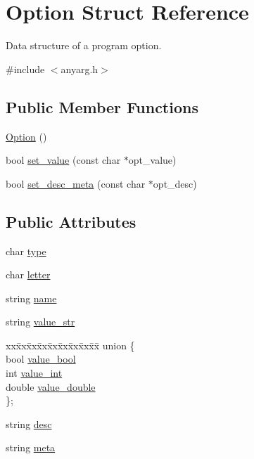 \hypertarget{struct_option}{}\section{Option Struct Reference}
\label{struct_option}


Data structure of a program option.  




{\ttfamily \#include $<$anyarg.\+h$>$}

\subsection*{Public Member Functions}
\begin{DoxyCompactItemize}
\item 
\hyperlink{struct_option_af517613005312013c576eb9099a50464}{Option} ()
\item 
bool \hyperlink{struct_option_aacdbd19f75a4b720896e08771866c070}{set\+\_\+value} (const char $\ast$opt\+\_\+value)
\item 
bool \hyperlink{struct_option_a41dfc9bb0d5ce3e4c33039cf56801bf3}{set\+\_\+desc\+\_\+meta} (const char $\ast$opt\+\_\+desc)
\end{DoxyCompactItemize}
\subsection*{Public Attributes}
\begin{DoxyCompactItemize}
\item 
char \hyperlink{struct_option_a08dcf2742c8429087baaacf694089cbe}{type}
\item 
char \hyperlink{struct_option_add92e993875c6dfd378c51418d253e84}{letter}
\item 
string \hyperlink{struct_option_a2a2fd32b8112451bdfd96322c098b6a3}{name}
\item 
string \hyperlink{struct_option_a3f52e913f047b38e95b1490d76eeff00}{value\+\_\+str}
\item 
\begin{tabbing}
xx\=xx\=xx\=xx\=xx\=xx\=xx\=xx\=xx\=\kill
union \{\\
\>bool \hyperlink{struct_option_adfda258d1ec248be6deb65763cceaa07}{value\_bool}\\
\>int \hyperlink{struct_option_a186e1e38cbb463db97e6ac0bd9df2c7f}{value\_int}\\
\>double \hyperlink{struct_option_a9bb84a8ae8e06721694e5b8fb6a35775}{value\_double}\\
\}; \\

\end{tabbing}\item 
string \hyperlink{struct_option_acead0e0fe56632ced43978c9a09a60db}{desc}
\item 
string \hyperlink{struct_option_a565dc0f1d839f046c68c12d1b4a6a5fa}{meta}
\end{DoxyCompactItemize}


